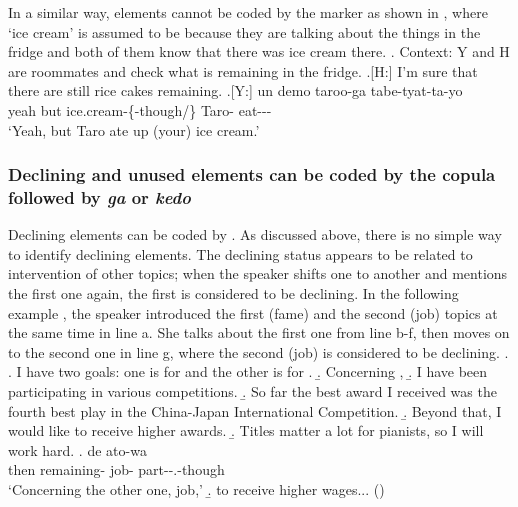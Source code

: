In a similar way,
 elements cannot be coded by the marker
as shown in \Next,
where `ice cream' is assumed to be  because they are talking about the things in the fridge and both of them know that there was ice cream there.
%
\ex. Context:
	Y and H are roommates and check what is remaining in the fridge.
	\a.[H:] I'm sure that there are still rice cakes remaining.
	\bg.[Y:] un demo  taroo-ga tabe-tyat-ta-yo \\
		yeah but ice.cream-\{-though/\} Taro- eat--- \\
		`Yeah, but Taro ate up (your) ice cream.'


\subsubsection{Declining and unused elements can be coded by the copula followed by \textit{ga} or \textit{kedo}}

Declining elements can be coded by .
As discussed above,
there is no simple way to identify declining elements.
The declining status appears to be related to intervention of other topics;
when the speaker shifts one  to another  and mentions the first one again,
the first  is considered to be declining.
In the following example \Next,
the speaker introduced the first (fame) and the second (job) topics at the same time in line a.
She talks about the first one from line b-f,
then moves on to the second one in line g,
where the second  (job) is considered to be declining.
%
\ex.\label{sigoto2}
 \a. I have two goals: one is for  and the other is for .
 \b. Concerning ,
 \b. I have been participating in various  competitions.
 \b. So far the best award I received was the fourth best play in the China-Japan International Competition.
 \b. Beyond that, I would like to receive higher awards.
 \b. Titles matter a lot for pianists, so I will work hard.
 \bg. de ato-wa   \\
 	then remaining- job- part--.-though \\
	`Concerning the other one, job,'
 \b. to receive higher wages...
\hfill{()}
%

